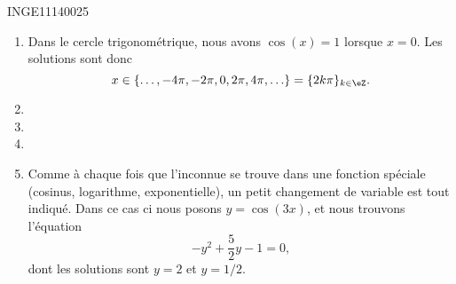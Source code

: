 
\begin{corrige}{INGE11140025}

	\begin{enumerate}

		\item
			Dans le cercle trigonométrique, nous avons $\cos(x)=1$ lorsque $x=0$. Les solutions sont donc 
			\begin{equation}
				x\in\{ \ldots,-4\pi,-2\pi, 0,2\pi,4\pi,\ldots \}=\{ 2k\pi \}_{k\in\eZ}.
			\end{equation}
		\item
		\item
		\item
		\item
			Comme à chaque fois que l'inconnue se trouve dans une fonction spéciale (cosinus, logarithme, exponentielle), un petit changement de variable est tout indiqué. Dans ce cas ci nous posons $y=\cos(3x)$, et nous trouvons l'équation
			\begin{equation}
				-y^2+\frac{ 5 }{2}y-1=0,
			\end{equation}
			dont les solutions sont $y=2$ et $y=1/2$.


\end{enumerate}
\end{corrige}
